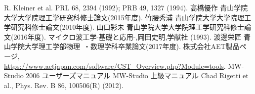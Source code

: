 \begin{thebibliography}{12}
   R. Kleiner et al. PRL 68, 2394 (1992); PRB 49, 1327 (1994).
   高橋優作 青山学院大学大学院理工学研究科修士論文(2015年度).
   竹腰秀浦 青山学院大学大学院理工学研究科修士論文(2010年度).
   山口彩未 青山学院大学大学院理工学研究科修士論文(2016年度).
   マイクロ波工学-基礎と応用-,岡田史明,学献社 (1993).
   渡邊栄匠 青山学院大学理工学部物理 ・数理学科卒業論文(2017年度).
   株式会社AET製品ページ,\\ \url{https://www.aetjapan.com/software/CST_Overview.php?Module=tools}.
   MW-Studio 2006 ユーザーズマニュアル
   MW-Studio 上級マニュアル
   Chad Rigetti et al., Phys. Rev. B 86, 100506(R) (2012).

\end{thebibliography}
